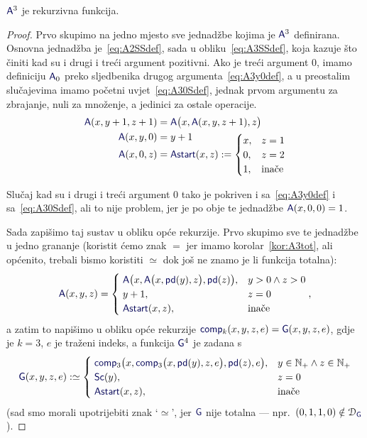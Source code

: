 \begin{propozicija}[{name=[rekurzivnost Ackermannove funkcije]}]
    $\f A^3$ je rekurzivna funkcija.
\end{propozicija}
\begin{proof}
Prvo skupimo na jedno mjesto sve jednadžbe kojima je $\f A^3$ definirana. Osnovna jednadžba je~\eqref{eq:A2SSdef}, sada u obliku~\eqref{eq:A3SSdef}, koja kazuje što činiti kad su i drugi i treći argument pozitivni. Ako je treći argument $0$, imamo definiciju $\f A_0$ preko sljedbenika drugog argumenta~\eqref{eq:A3y0def}, a u preostalim slučajevima imamo početni uvjet~\eqref{eq:A30Sdef}, jednak prvom argumentu za zbrajanje, nuli za množenje, a jedinici za ostale operacije.
\begin{align}
\label{eq:A3SSdef}
    \f A(x,y+1,z+1)&=\f A\bigl(x,\f A(x,y,z+1),z\bigr)\\
\label{eq:A3y0def}
    \f A(x,y,0)&=y+1\\[-5mm]
\label{eq:A30Sdef}
    \f A(x,0,z)&=\f{Astart}(x,z):=\begin{cases}
        x,&z=1\\
        0,&z=2\\
        1,&\text{inače}
    \end{cases}
\end{align}

Slučaj kad su i drugi i treći argument $0$ tako je pokriven i sa~\eqref{eq:A3y0def} i sa~\eqref{eq:A30Sdef}, ali to nije problem, jer je po obje te jednadžbe $\f A(x,0,0)=1$.

Sada zapišimo taj sustav u obliku opće rekurzije. Prvo skupimo sve te jednadžbe u jedno grananje (koristit ćemo znak $=$ jer imamo korolar~\ref{kor:A3tot}, ali općenito, trebali bismo koristiti $\simeq$ dok još ne znamo je li funkcija totalna):
\begin{equation}
    \f A(x,y,z)=\begin{cases}
        \;\f A\bigl(x,\f A\bigl(x,\f{pd}(y),z\bigr),\f{pd}(z)\bigr),&y>0\land z>0\\
        \;y+1,&z=0\\
        \;\f{Astart}(x,z),&\text{inače}
    \end{cases}\text,
\end{equation}
a zatim to napišimo u obliku opće rekurzije $\f{comp}_k(x,y,z,e)=\f G(x,y,z,e)$, gdje je $k=3$, $e$ je traženi indeks, a funkcija $\f G^4$ je zadana s
\begin{equation}
    \f G(x,y,z,e):\simeq\begin{cases}
        \;\f{comp}_3\bigl(x,\f{comp}_3\bigl(x,\f{pd}(y),z,e\bigr),\f{pd}(z),e\bigr),&y\in\N_+\land z\in\N_+\\
        \;\f{Sc}(y),&z=0\\
        \;\f{Astart}(x,z),&\text{inače}
    \end{cases}
\end{equation}
    (sad smo morali upotrijebiti znak \enquote*{$\simeq$}, jer $\f G$ nije totalna --- npr.\ $(0,1,1,0)\notin\dom{\f G}$).


\end{proof}
